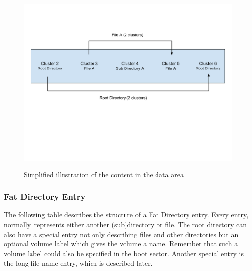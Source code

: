 \begin{figure}[h!]
\caption{Simplified illustration of the content in the data area}
\centering
\includegraphics[scale=0.62]{figures/fat_data_area}
\label{figure:data_area}
\end{figure}

\subsubsection{Fat Directory Entry}

The following table describes the structure of a Fat Directory entry. Every entry, normally, represents either another (sub)directory or file. The root directory can also have a special entry not only describing files and other directories but an optional volume label which gives the volume a name. Remember that such a volume label could also be specified in the boot sector. Another special entry is the long file name entry, which is described later.

